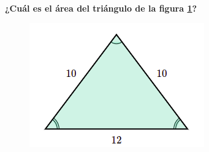 \begin{multicols}{2}
    \textbf{¿Cuál es el \'area del triángulo de la figura \ref{fig:area_isoseles_01}?}

    \begin{figure}[H]
        \centering
        \includegraphics[width=0.5\linewidth]{../images/area_isoseles_01.png}
        \caption{}
        \label{fig:area_isoseles_01}
    \end{figure}
\end{multicols}\vspace{-0.5cm}

